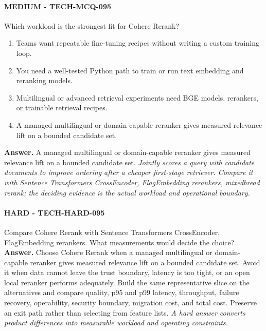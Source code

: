 \paragraph{MEDIUM - TECH-MCQ-095} Which workload is the strongest fit for Cohere Rerank?
\begin{enumerate}[label=\Alph*.]
\item Teams want repeatable fine-tuning recipes without writing a custom training loop.
\item You need a well-tested Python path to train or run text embedding and reranking models.
\item Multilingual or advanced retrieval experiments need BGE models, rerankers, or trainable retrieval recipes.
\item A managed multilingual or domain-capable reranker gives measured relevance lift on a bounded candidate set.
\end{enumerate}
\textbf{Answer.} A managed multilingual or domain-capable reranker gives measured relevance lift on a bounded candidate set.
\textit{Jointly scores a query with candidate documents to improve ordering after a cheaper first-stage retriever. Compare it with Sentence Transformers CrossEncoder, FlagEmbedding rerankers, mixedbread rerank; the deciding evidence is the actual workload and operational boundary.}
\paragraph{HARD - TECH-HARD-095} Compare Cohere Rerank with Sentence Transformers CrossEncoder, FlagEmbedding rerankers. What measurements would decide the choice?
\textbf{Answer.} Choose Cohere Rerank when a managed multilingual or domain-capable reranker gives measured relevance lift on a bounded candidate set. Avoid it when data cannot leave the trust boundary, latency is too tight, or an open local reranker performs adequately. Build the same representative slice on the alternatives and compare quality, p95 and p99 latency, throughput, failure recovery, operability, security boundary, migration cost, and total cost. Preserve an exit path rather than selecting from feature lists.
\textit{A hard answer converts product differences into measurable workload and operating constraints.}
